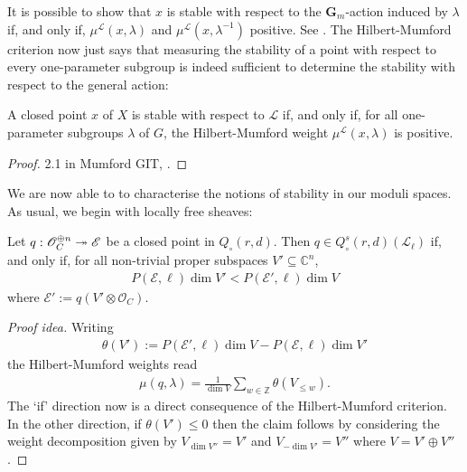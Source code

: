 \documentclass[12pt]{ociamthesis}  %
\begin{document}
It is possible to show that $x$ is stable with
respect to the $\mathbf G_m$-action induced by $\lambda$ if, and only
if, $\mu^{\mathscr L}(x,\lambda)$ and $\mu^{\mathscr L}(x,\lambda^{-1})$
positive.
See \cite[Lemma 6.9]{hoskins2016}.
The Hilbert-Mumford criterion now just says that measuring the
stability of a point with respect to every one-parameter subgroup
is indeed sufficient to determine the stability with respect to the
general action:

\begin{theorem}
  A closed point $x$ of $X$ is stable with
  respect to $\mathscr L$ if, and only if, for all one-parameter
  subgroups $\lambda$ of $G$, the Hilbert-Mumford weight
  $\mu^{\mathscr L}(x,\lambda)$ is positive.
  \begin{proof}
    2.1 in Mumford GIT, \cite[Theorem 4.9]{newstead1978}.
    \missingproof
  \end{proof}
\end{theorem}

We are now able to to characterise the notions of stability
in our moduli spaces. As usual, we begin with locally free sheaves:

\begin{example}\label{ex:lf_git_stability}
  Let $q : \mathscr O^{\oplus n}_C \twoheadrightarrow \mathscr E$ be a closed point
  in $Q_\circ(r,d)$. Then $q\in Q^{s}_\circ(r,d)(\mathscr L_\ell)$
  if, and only if, for all non-trivial proper subspaces
  $V'\subseteq \mathbb C^n$,
  \begin{align}\label{eq:git_stable_sheaf}
    P(\mathscr E,\ell)\dim V'< P(\mathscr E',\ell)\dim V
  \end{align}
  where $\mathscr E' := q(V'\otimes\mathscr O_C)$.
  \begin{proof}[Proof idea]
    Writing
    \begin{align*}
      \theta(V') := P(\mathscr E',\ell)\dim V-P(\mathscr E,\ell)\dim V'
    \end{align*}
    the Hilbert-Mumford weights read
    \begin{align*}
      \mu(q,\lambda) = \frac{1}{\dim V}\sum_{w\in\mathbb Z} \theta(V_{\leq w}).
    \end{align*}
    The `if' direction now is a direct consequence of the Hilbert-Mumford
    criterion. In the other direction, if $\theta(V')\leq 0$ then the
    claim follows by considering the weight decomposition given by
    $V_{\dim V''} = V'$ and $V_{-\dim V'} = V''$
    where $V = V' \oplus V''$.
  \end{proof}
\end{example}
\end{document}
